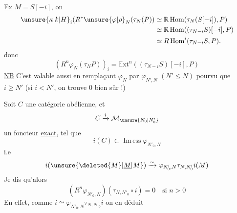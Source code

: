 \uline{Ex} \quad $M=S[-i]$, on 
\[
\begin{aligned}
\unsure{\kappa|k|H}_i(R^*\unsure{\varphi|\rho}_N(\tau_N(P))&\simeq\mathbb R\operatorname{Hom}(\tau_N(S[-i]),P)\\
&\simeq\mathbb R\operatorname{Hom}((\tau_{N-i}S)[-i],P)\\
&\simeq R\operatorname{Hom}^i(\tau_{N-i}S,P).
\end{aligned}
\]
donc
\[
(R^n\varphi_N(\tau_N P))_i=\mathbb E\mathrm{xt}^n((\tau_{N-i}S)[-i],P)
\]
\uline{NB} C'est valable aussi en remplaçant $\varphi_N$ par $\varphi_{N',N}$ $(N'\leq N)$ pourvu que $i\geq N'$ (si $i<N'$, on trouve 0 bien sûr !)



Soit $C$ une catégorie abélienne,  et
\[
C\xrightarrow{i}\mathcal M_{\unsure{N_0|N'_0}}
\]
un foncteur \uline{exact}, tel que
\[
i(C)\subset\operatorname{Im\,ess}\varphi_{N'_0,N}
\]
i.e
\[
i(\unsure{\deleted{M}|\underline M|M})\xrightarrow{\sim}\varphi_{N'_0,N}\tau_{N,N'_0}i(M)
\]
Je dis qu'alors
\[
(R^n\varphi_{N'_0,N})(\tau_{N,N'_0}\circ i)=0\quad\text{si }n>0
\]
En effet, comme $i\simeq\varphi_{N'_0,N}\tau_{N,N'_0}i$ on en déduit

